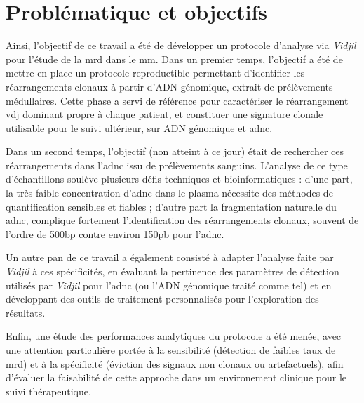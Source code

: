 \chapter{Problématique et objectifs}

Ainsi, l'objectif de ce travail a été de développer un protocole d'analyse via \textit{Vidjil} 
pour l'étude de la \gls{mrd} dans le \gls{mm}. Dans un premier temps, l'objectif a été 
de mettre en place un protocole reproductible permettant d'identifier les réarrangements clonaux 
à partir d'ADN génomique, extrait de prélèvements médullaires. Cette phase a servi de référence 
pour caractériser le réarrangement \gls{vdj} dominant propre à chaque patient, et constituer une 
signature clonale utilisable pour le suivi ultérieur, sur ADN génomique et \gls{adnc}.

Dans un second temps, l'objectif (non atteint à ce jour) était de rechercher ces réarrangements dans l'\gls{adnc} 
issu de prélèvements sanguins. L'analyse de ce type d'échantillons soulève plusieurs défis techniques et 
bioinformatiques : d'une part, la très faible concentration d'\gls{adnc} dans le plasma nécessite des méthodes de 
quantification sensibles et fiables ; d'autre part la fragmentation naturelle du \gls{adnc}, complique fortement 
l'identification des réarrangements clonaux, souvent de l'ordre de 500bp contre environ 150pb pour l'\gls{adnc}. 

Un autre pan de ce travail a également consisté à adapter l'analyse faite par \textit{Vidjil} à ces spécificités, 
en évaluant la pertinence des paramètres de détection utilisés par \textit{Vidjil} pour l'\gls{adnc} (ou l'ADN génomique 
traité comme tel) et en développant des outils de traitement personnalisés pour l'exploration des résultats. 

Enfin, une étude des performances analytiques du protocole a été menée, avec une attention particulière portée à la 
sensibilité (détection de faibles taux de \gls{mrd}) et à la spécificité (éviction des signaux non clonaux ou artefactuels), 
afin d'évaluer la faisabilité de cette approche dans un environement clinique pour le suivi thérapeutique.

